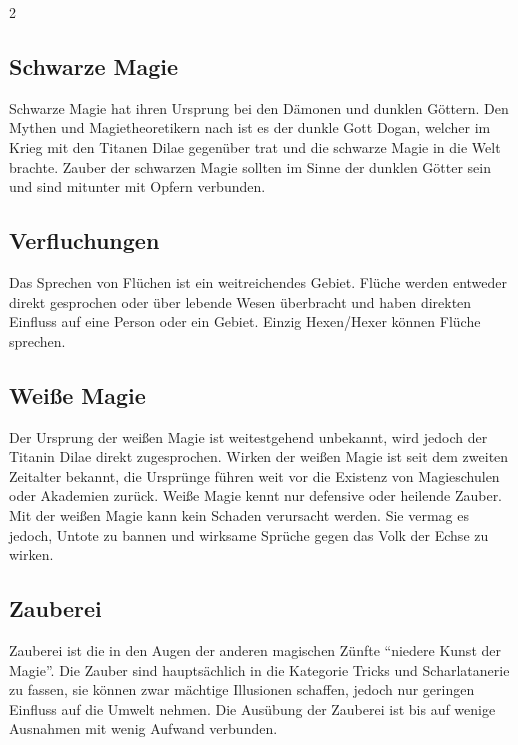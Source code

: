 \begin{multicols*}{2}
\subsection{Schwarze Magie}\label{subsec:schwarze-magie}

Schwarze Magie hat ihren Ursprung bei den Dämonen und dunklen Göttern.
Den Mythen und Magietheoretikern nach ist es der dunkle Gott Dogan, welcher im Krieg mit den Titanen Dilae gegenüber trat und die schwarze Magie in die Welt brachte.
Zauber der schwarzen Magie sollten im Sinne der dunklen Götter sein und sind mitunter mit Opfern verbunden.

\subsection{Verfluchungen}\label{subsec:verfluchungen}

Das Sprechen von Flüchen ist ein weitreichendes Gebiet.
Flüche werden entweder direkt gesprochen oder über lebende Wesen überbracht und haben direkten Einfluss auf eine Person oder ein Gebiet.
Einzig Hexen/Hexer können Flüche sprechen.

\subsection{Weiße Magie}\label{subsec:weie-magie}

Der Ursprung der weißen Magie ist weitestgehend unbekannt, wird jedoch der Titanin Dilae direkt zugesprochen.
Wirken der weißen Magie ist seit dem zweiten Zeitalter bekannt, die Ursprünge führen weit vor die Existenz von Magieschulen oder Akademien zurück.
Weiße Magie kennt nur defensive oder heilende Zauber.
Mit der weißen Magie kann kein Schaden verursacht werden.
Sie vermag es jedoch, Untote zu bannen und wirksame Sprüche gegen das Volk der Echse zu wirken.

\subsection{Zauberei}\label{subsec:zauberei}

Zauberei ist die in den Augen der anderen magischen Zünfte ``niedere Kunst der Magie''.
Die Zauber sind hauptsächlich in die Kategorie Tricks und Scharlatanerie zu fassen, sie können zwar mächtige Illusionen schaffen, jedoch nur geringen Einfluss auf die Umwelt nehmen.
Die Ausübung der Zauberei ist bis auf wenige Ausnahmen mit wenig Aufwand verbunden.


\end{multicols*}
